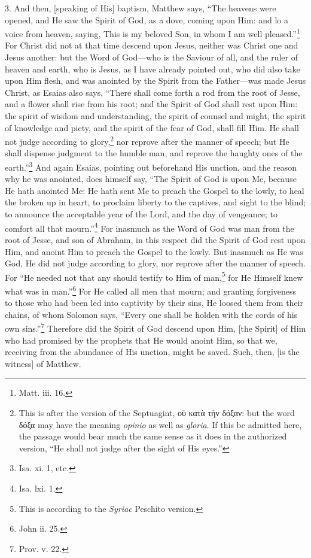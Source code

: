 3. And then, [speaking of His] baptism, Matthew says, “The heavens were opened, and He saw the Spirit of God, as a dove, coming upon Him: and lo a voice from heaven, saying, This is my beloved Son, in whom I am well pleased.”\footnote{Matt. iii. 16.} For Christ did not at that time descend upon Jesus, neither was Christ one and Jesus another: but the Word of God—who is the Saviour of all, and the ruler of heaven and earth, who is Jesus, as I have already pointed out, who did also take upon Him flesh, and was anointed by the Spirit from the Father—was made Jesus Christ, as Esaias also says, “There shall come forth a rod from the root of Jesse, and a flower shall rise from his root; and the Spirit of God shall rest upon Him: the spirit of wisdom and understanding, the spirit of counsel and might, the spirit of knowledge and piety, and the spirit of the fear of God, shall fill Him. He shall not judge according to glory,\footnote{This is after the version of the Septuagint, \textgreek{οὐ κατὰ τὴν δόξαν}: but the word \textgreek{δόξα} may have the meaning \emph{opinio} as well as \emph{gloria}. If this be admitted here, the passage would bear much the same sense as it does in the authorized version, “He shall not judge after the sight of His eyes.”} nor reprove after the manner of speech; but He shall dispense judgment to the humble man, and reprove the haughty ones of the earth.”\footnote{Isa. xi. 1, etc.} And again Esaias, pointing out beforehand His unction, and the reason why he was anointed, does himself say, “The Spirit of God is upon Me, because He hath anointed Me: He hath sent Me to preach the Gospel to the lowly, to heal the broken up in heart, to proclaim liberty to the captives, and sight to the blind; to announce the acceptable year of the Lord, and the day of vengeance; to comfort all that mourn.”\footnote{Isa. lxi. 1.} For inasmuch as the Word of God was man from the root of Jesse, and son of Abraham, in this respect did the Spirit of God rest upon Him, and anoint Him to preach the Gospel to the lowly. But inasmuch as He was God, He did not judge according to glory, nor reprove after the manner of speech. For “He needed not that any should testify to Him of man,\footnote{This is according to the \emph{Syriac} Peschito version.} for He Himself knew what was in man.”\footnote{John ii. 25.} For He called all men that mourn; and granting forgiveness to those who had been led into captivity by their sins, He loosed them from their chains, of whom Solomon says, “Every one shall be holden with the cords of his own sins.”\footnote{Prov. v. 22.} Therefore did the Spirit of God descend upon Him, [the Spirit] of Him who had promised by the prophets that He would anoint Him, so that we, receiving from the abundance of His unction, might be saved. Such, then, [is the witness] of Matthew.

